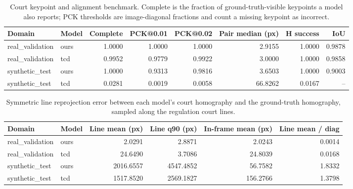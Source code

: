 
\begin{table}[t]
\centering
\caption{Court keypoint and alignment benchmark. Complete is the fraction of ground-truth-visible keypoints a model also reports; PCK thresholds are image-diagonal fractions and count a missing keypoint as incorrect.}
\label{tab:court-alignment}
\begin{tabular}{llrrrrrr}
\toprule
Domain & Model & Complete & PCK@0.01 & PCK@0.02 & Pair median (px) & H success & IoU \\
\midrule
real\_validation & ours & 1.0000 & 1.0000 & 1.0000 & 2.9155 & 1.0000 & 0.9878 \\
real\_validation & tcd & 0.9952 & 0.9779 & 0.9922 & 3.0000 & 1.0000 & 0.9858 \\
synthetic\_test & ours & 1.0000 & 0.9313 & 0.9816 & 3.6503 & 1.0000 & 0.9003 \\
synthetic\_test & tcd & 0.0281 & 0.0019 & 0.0058 & 66.8262 & 0.0167 & -- \\
\bottomrule
\end{tabular}
\end{table}

\begin{table}[t]
\centering
\caption{Symmetric line reprojection error between each model's court homography and the ground-truth homography, sampled along the regulation court lines.}
\label{tab:court-alignment-lines}
\begin{tabular}{llrrrr}
\toprule
Domain & Model & Line mean (px) & Line q90 (px) & In-frame mean (px) & Line mean / diag \\
\midrule
real\_validation & ours & 2.0291 & 2.8871 & 2.0243 & 0.0014 \\
real\_validation & tcd & 24.6490 & 3.7086 & 24.8039 & 0.0168 \\
synthetic\_test & ours & 2016.6557 & 4547.4852 & 56.7582 & 1.8332 \\
synthetic\_test & tcd & 1517.8520 & 2569.1827 & 156.2766 & 1.3798 \\
\bottomrule
\end{tabular}
\end{table}
